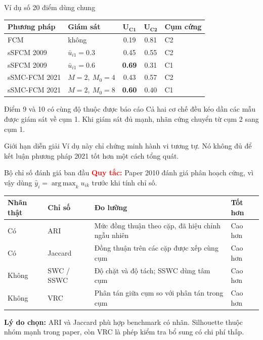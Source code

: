 \documentclass[t,aspectratio=169]{beamer}
\begin{document}
\begin{frame}{Ví dụ số 20 điểm dùng chung}
  \centering
  \small
  \setlength{\tabcolsep}{3pt}
  \renewcommand{\arraystretch}{1.22}
  \begin{tabular}{p{4.4cm}|p{3.1cm}|c|c|p{2.0cm}}
    \textbf{Phương pháp} & \textbf{Giám sát} & $\boldsymbol{U_{C1}}$ & $\boldsymbol{U_{C2}}$ & \textbf{Cụm cứng} \\
    \hline
    FCM & không & 0.19 & 0.81 & C2 \\
    sSFCM 2009 & $\bar u_{i1}=0.3$ & 0.45 & 0.55 & C2 \\
    sSFCM 2009 & $\bar u_{i1}=0.6$ & \textbf{0.69} & 0.31 & C1 \\
    sSMC-FCM 2021 & $M=2,\ M_0=4$ & 0.43 & 0.57 & C2 \\
    sSMC-FCM 2021 & $M=2,\ M_0=8$ & \textbf{0.60} & 0.40 & C1 \\
  \end{tabular}

  \vspace{0.6em}
  \begin{block}{Điểm 9 và 10 có cùng độ thuộc được báo cáo}
    Cả hai cơ chế đều kéo dần các mẫu được giám sát về cụm 1. Khi giám sát đủ mạnh, nhãn cứng chuyển từ cụm 2 sang cụm 1.
  \end{block}
  \begin{alertblock}{Giới hạn diễn giải}
    Ví dụ này chỉ chứng minh hành vi tương tự. Nó không đủ để kết luận phương pháp 2021 tốt hơn một cách tổng quát.
  \end{alertblock}
\end{frame}

\begin{frame}{Bộ chỉ số đánh giá ban đầu}
  \small
  \textbf{\textcolor{red}{Quy tắc:}} Paper 2010 đánh giá phân hoạch cứng, vì vậy dùng
  $\hat y_i=\operatorname*{arg\,max}_{k}u_{ik}$ trước khi tính chỉ số.

  \vspace{0.35em}
  \centering
  \footnotesize
  \setlength{\tabcolsep}{3pt}
  \renewcommand{\arraystretch}{1.18}
  \begin{tabular}{p{2.25cm}|p{2.35cm}|p{6.2cm}|p{1.75cm}}
    \textbf{Nhãn thật} & \textbf{Chỉ số} & \textbf{Đo lường} & \textbf{Tốt hơn} \\
    \hline
    Có & ARI & Mức đồng thuận theo cặp, đã hiệu chỉnh ngẫu nhiên & Cao hơn \\
    Có & Jaccard & Đồng thuận trên các cặp được xếp cùng cụm & Cao hơn \\
    Không & SWC / SSWC & Độ chặt và độ tách; SSWC dùng tâm cụm & Cao hơn \\
    Không & VRC & Phân tán giữa cụm so với phân tán trong cụm & Cao hơn \\
  \end{tabular}

  \vspace{0.45em}
  \raggedright
  \small
  \textbf{Lý do chọn:} ARI và Jaccard phù hợp benchmark có nhãn. Silhouette thuộc nhóm mạnh trong paper, còn VRC là phép kiểm tra bổ sung có chi phí thấp.
\end{frame}
\end{document}
